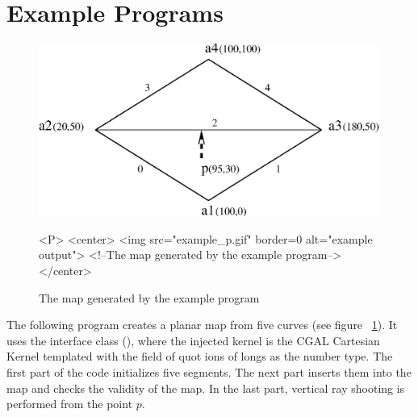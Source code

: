
\section{Example Programs}
\label{PM_sec:example}

\begin{figure}[h]
\begin{ccTexOnly}
    \centerline{
      \includegraphics{example_p.ps}
    }
\end{ccTexOnly}

\caption{The map generated by the example program
\label{PM_sec:example_pic}}

\begin{ccHtmlOnly}
    <P>
    <center>
        <img src="example_p.gif"  border=0 alt="example output">
        <!--The map generated by the example program-->
    </center>
\end{ccHtmlOnly}
\end{figure}

The following program creates a planar map from five curves (see figure
~\ref{PM_sec:example_pic}). It uses the interface class
(), where the injected kernel is the
CGAL Cartesian Kernel templated with the field of quot ions of longs as the
number type.
The first part of the code initializes five segments. The next part inserts them
into the map and checks the validity of the map. In the last part, vertical ray
shooting is performed from the point $p$.


